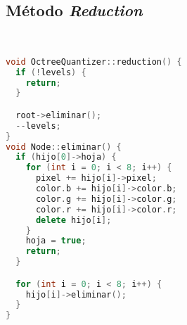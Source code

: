 \subsection{Método \textit{Reduction}}
\\
\begin{lstlisting}[language=C++,
                   directivestyle={\color{black}}
                   emph={int,char,double,float,unsigned},
                   emphstyle={\color{blue}}
                  ]
void OctreeQuantizer::reduction() {
  if (!levels) {
    return;
  }

  root->eliminar();
  --levels;
}
void Node::eliminar() {
  if (hijo[0]->hoja) {
    for (int i = 0; i < 8; i++) {
      pixel += hijo[i]->pixel;
      color.b += hijo[i]->color.b;
      color.g += hijo[i]->color.g;
      color.r += hijo[i]->color.r;
      delete hijo[i];
    }
    hoja = true;
    return;
  }

  for (int i = 0; i < 8; i++) {
    hijo[i]->eliminar();
  }
}
\end{lstlisting}